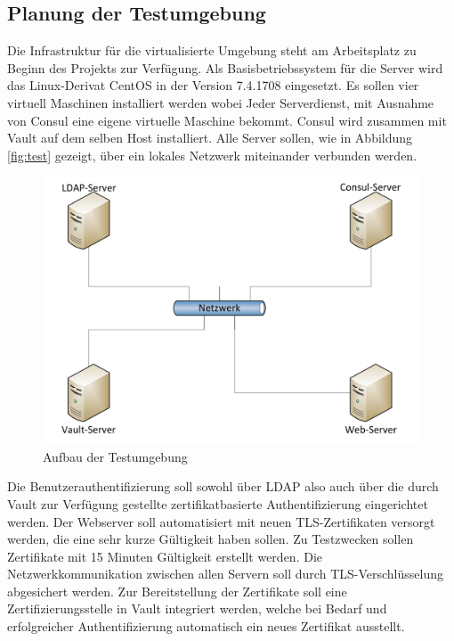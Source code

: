 \documentclass[
book,
a4paper,   
titlepage,  
halfparskip,
12pt        
]{scrartcl}
\begin{document}
\begin{onehalfspacing}
\subsection{Planung der Testumgebung}
\label{subsec:plan}
Die Infrastruktur für die virtualisierte Umgebung steht am Arbeitsplatz zu Beginn des Projekts zur Verfügung. Als Basisbetriebssystem für die Server wird das Linux-Derivat CentOS in der Version 7.4.1708 eingesetzt. Es sollen vier virtuell Maschinen installiert werden wobei Jeder Serverdienst, mit Ausnahme von Consul eine eigene virtuelle Maschine bekommt. Consul wird zusammen mit Vault auf dem selben Host installiert. Alle Server sollen, wie in Abbildung \vref{fig:test} gezeigt, über ein lokales Netzwerk miteinander verbunden werden.\newline
\begin{figure}[h]
	\centering
	\includegraphics[width=1\linewidth]{plan}
	\caption[Netzplan]{Aufbau der Testumgebung}
	\label{fig:test}
\end{figure}
Die Benutzerauthentifizierung soll sowohl über \ac{LDAP} also auch über die durch Vault zur Verfügung gestellte zertifikatbasierte Authentifizierung eingerichtet werden. Der Webserver soll automatisiert mit neuen \ac{TLS}-Zertifikaten versorgt werden, die eine sehr kurze Gültigkeit haben sollen. Zu Testzwecken sollen Zertifikate mit 15 Minuten Gültigkeit erstellt werden. Die Netzwerkkommunikation zwischen allen Servern soll durch \ac{TLS}-Verschlüsselung abgesichert werden. Zur Bereitstellung der Zertifikate soll eine Zertifizierungsstelle in Vault integriert werden, welche bei Bedarf und erfolgreicher Authentifizierung automatisch ein neues Zertifikat ausstellt. 

\end{onehalfspacing}
\end{document}
